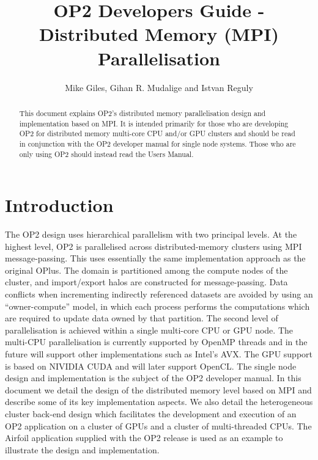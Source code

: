 \documentclass[11pt]{article}
\begin{document}
\title{OP2 Developers Guide - Distributed Memory (MPI) Parallelisation}
\author{Mike Giles, Gihan R. Mudalige and Istvan Reguly}

\maketitle

\begin{abstract}
\noindent This document explains OP2's distributed memory parallelisation design
and implementation based on MPI.  It is intended primarily for those who are
developing OP2 for distributed memory multi-core CPU and/or GPU clusters and
should be read in conjunction with the OP2 developer manual for single node
systems. Those who are only using OP2 should
instead read the Users Manual.
\end{abstract}

\newpage




\tableofcontents

\newpage

\section{Introduction}
The OP2 design uses hierarchical parallelism with two principal levels. At the
highest level, OP2 is parallelised across distributed-memory clusters using MPI
message-passing.  This uses essentially the same implementation approach as the
original OPlus. The domain is partitioned among the compute nodes
of the cluster, and import/export halos are constructed for message-passing.
Data conflicts when  incrementing indirectly referenced datasets are avoided by
using an ``owner-compute'' model, in which each process performs the
computations which are required to update data owned by that partition.  The
second level of parallelisation is achieved within a single multi-core CPU or
GPU node. The multi-CPU parallelisation is currently supported by OpenMP threads
and in the future will support other implementations such as Intel's AVX. The GPU
support is based on NIVIDIA CUDA and will later support OpenCL. The single node
design and implementation is the subject of the OP2 developer manual. In this
document we detail the design of the distributed memory level based on MPI and
describe some of its key implementation aspects. We also detail the
heterogeneous cluster back-end design which facilitates the development and
execution of an OP2 application on a cluster of GPUs and a cluster of
multi-threaded CPUs. The Airfoil application supplied with the OP2 release is
used as an example to illustrate the design and implementation.
\end{document}
